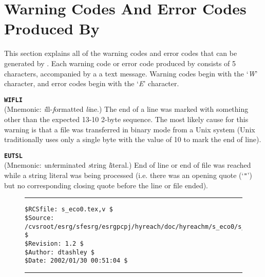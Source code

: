 %
\section[Warning And Error Codes]{Warning Codes And Error Codes Produced By \swname{}}
\label{seco0}

This section explains
all of the warning codes and error codes that can be
generated by \swname{}.  Each warning code or error code
produced by \swname{} consists of 5 characters, accompanied by a a text
message.  Warning codes begin with the `\emph{W}' character, and 
error codes begin with the `\emph{E}' character.

\begin{glossaryenum}
\item {}\textbf{\texttt{WIFLI}} \\
      (Mnemonic:  \emph{i}ll-\emph{f}ormatted \emph{li}ne.)   The end
      of a line was marked with something other than the expected 13-10 2-byte 
      sequence.  The most likely cause for this warning is that a
      file was transferred in binary mode from a Unix system (Unix 
      traditionally uses only a single byte with the value of 10 to
      mark the end of line).

\item {}\textbf{\texttt{EUTSL}} \\
      (Mnemonic:  \emph{u}n\emph{t}erminated \emph{s}tring \emph{l}iteral.)
      End of line or end of file was reached while a string literal was
      being processed (i.e. there was an opening quote (`\texttt{"}') but
      no corresponding closing quote before the line or file ended).

\end{glossaryenum}

\noindent\begin{figure}[!b]
\noindent\rule[-0.25in]{\textwidth}{1pt}
\begin{tiny}
\begin{verbatim}
$RCSfile: s_eco0.tex,v $
$Source: /cvsroot/esrg/sfesrg/esrgpcpj/hyreach/doc/hyreachm/s_eco0/s_eco0.tex,v $
$Revision: 1.2 $
$Author: dtashley $
$Date: 2002/01/30 00:51:04 $
\end{verbatim}
\end{tiny}
\noindent\rule[0.25in]{\textwidth}{1pt}
\end{figure}
%
%
%
%
%
%
%
